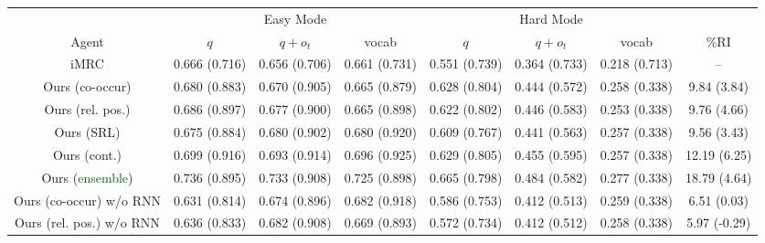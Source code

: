 \documentclass[11pt]{article}
\newcommand{\imrc}{iMRC\xspace}
\begin{document}
\begin{table*}%
    \centering
    \scriptsize
    \begin{tabular}{c|ccc|ccc|c}
        \toprule
        & \multicolumn{3}{c|}{Easy Mode} & \multicolumn{3}{c|}{Hard Mode} &  \\
        Agent & $q$ & $q + o_t$ & vocab & $q$ & $q + o_t$ & vocab & \%RI\\
        \midrule %
        \imrc \citep{yuan2020imrc}      & 0.666 \color{blue}(0.716) & 0.656 \color{blue}(0.706) & 0.661 \color{blue}(0.731) & 0.551 \color{blue}(0.739) & 0.364 \color{blue}(0.733) & 0.218 \color{blue}(0.713) & -- \\
        \midrule
        Ours (co-occur)                         & 0.680 \color{blue}(0.883) & 0.670 \color{blue}(0.905) & 0.665 \color{blue}(0.879) & 0.628 \color{blue}(0.804) & 0.444 \color{blue}(0.572) & 0.258 \color{blue}(0.338) & 9.84 \color{blue}(3.84) \\
        Ours (rel. pos.)                        & 0.686 \color{blue}(0.897) & 0.677 \color{blue}(0.900) & 0.665 \color{blue}(0.898) & 0.622 \color{blue}(0.802) & 0.446 \color{blue}(0.583) & 0.253 \color{blue}(0.338) & 9.76 \color{blue}(4.66) \\
        Ours (SRL)                              & 0.675 \color{blue}(0.884) & 0.680 \color{blue}(0.902) & 0.680 \color{blue}(0.920) & 0.609 \color{blue}(0.767) & 0.441 \color{blue}(0.563) & 0.257 \color{blue}(0.338) & 9.56 \color{blue}(3.43) \\
        Ours (cont.)                            & 0.699 \color{blue}(0.916) & 0.693 \color{blue}(0.914) & 0.696 \color{blue}(0.925) & 0.629 \color{blue}(0.805) & 0.455 \color{blue}(0.595) & 0.257 \color{blue}(0.338) & 12.19 \color{blue}(6.25) \\
        Ours (\textcolor{darkgreen}{ensemble})  & 0.736 \color{blue}(0.895) & 0.733 \color{blue}(0.908) & 0.725 \color{blue}(0.898) & 0.665 \color{blue}(0.798) & 0.484 \color{blue}(0.582) & 0.277 \color{blue}(0.338) & 18.79 \color{blue}(4.64) \\
        \midrule
        Ours (co-occur) w/o RNN                         & 0.631 \color{blue}(0.814) & 0.674 \color{blue}(0.896) & 0.682 \color{blue}(0.918) & 0.586 \color{blue}(0.753) & 0.412 \color{blue}(0.513) & 0.259 \color{blue}(0.338) & 6.51 \color{blue}(0.03) \\
        Ours (rel. pos.) w/o RNN                        & 0.636 \color{blue}(0.833) & 0.682 \color{blue}(0.908) & 0.669 \color{blue}(0.893) & 0.572 \color{blue}(0.734) & 0.412 \color{blue}(0.512) & 0.258 \color{blue}(0.338) & 5.97 \color{blue}(-0.29) \\

\end{tabular}
\end{table*}
\end{document}
